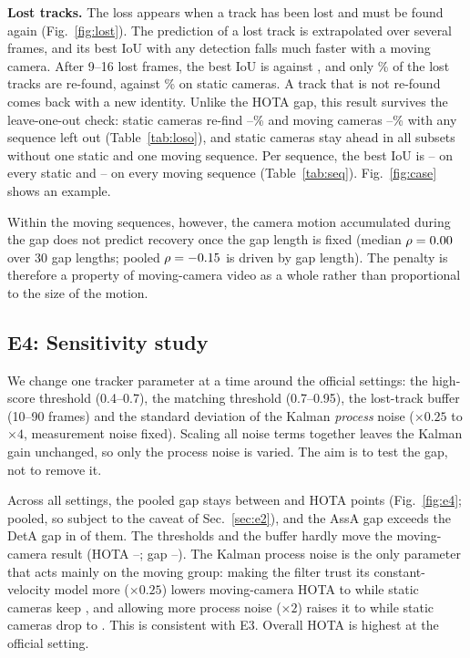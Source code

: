 \documentclass[conference]{IEEEtran}
\begin{document}
\textbf{Lost tracks.} The loss appears when a track has been lost and must be found again (Fig.~\ref{fig:lost}). The
prediction of a lost track is extrapolated over several frames, and its best IoU with any detection falls much faster
with a moving camera. After 9--16 lost frames, the best IoU is \vLostIoUMoving{} against \vLostIoUStatic{}, and only
\vLostMoving\% of the lost tracks are re-found, against \vLostStatic\% on static cameras. A track that is not re-found
comes back with a new identity. Unlike the HOTA gap, this result survives the leave-one-out check: static cameras
re-find \vLosoRefStatMin--\vLosoRefStatMax\% and moving cameras \vLosoRefMovMin--\vLosoRefMovMax\% with any sequence
left out (Table~\ref{tab:loso}), and static cameras stay ahead in all \vPairsRefCount{} subsets without one static and
one moving sequence. Per sequence, the best IoU is \vSeqBestIoUStatMin--\vSeqBestIoUStatMax{} on every static and
\vSeqBestIoUMovMin--\vSeqBestIoUMovMax{} on every moving sequence (Table~\ref{tab:seq}). Fig.~\ref{fig:case} shows an example.

Within the moving sequences, however, the camera motion accumulated during the gap does not predict recovery once the
gap length is fixed (median $\rho=0.00$ over 30 gap lengths; pooled $\rho=-0.15$ is driven by gap
length). The penalty is therefore a property of moving-camera video as a whole rather than proportional to the size
of the motion.



\subsection{E4: Sensitivity study}\label{sec:e4}
We change one tracker parameter at a time around the official settings: the high-score threshold (0.4--0.7), the
matching threshold (0.7--0.95), the lost-track buffer (10--90 frames) and the standard deviation of the Kalman
\emph{process} noise ($\times0.25$ to $\times4$, measurement noise fixed). Scaling all noise terms together leaves the Kalman gain unchanged, so only the process noise is varied. The aim is
to test the gap, not to remove it.

Across all \vEfourN{} settings, the pooled gap stays between \vEfourGapMin{} and \vEfourGapMax{} HOTA points
(Fig.~\ref{fig:e4}; pooled, so subject to the caveat of Sec.~\ref{sec:e2}), and the AssA gap exceeds the DetA gap in \vEfourAssaCount{} of them. The thresholds and the
buffer hardly move the moving-camera result (HOTA \vEfourOtherMovMin--\vEfourOtherMovMax; gap
\vEfourOtherGapMin--\vEfourOtherGapMax). The Kalman process noise is the only parameter that acts mainly on the moving
group: making the filter trust its constant-velocity model more ($\times0.25$) lowers moving-camera HOTA to
\vKfQuarterMov{} while static cameras keep \vKfQuarterStat, and allowing more process noise ($\times2$) raises it to
\vKfTwoMov{} while static cameras drop to \vKfTwoStat. This is consistent with E3. Overall HOTA is highest at the official setting.
\end{document}
